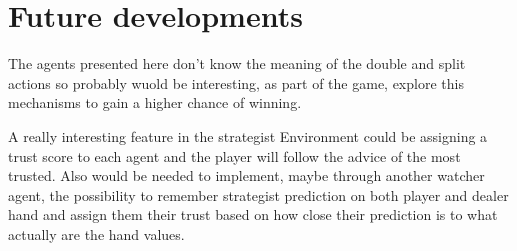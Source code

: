 \section{Future developments}

The agents presented here don't know the meaning of the double and split actions so probably wuold be interesting, as part of the game, explore this mechanisms to gain a higher chance of winning. 

A really interesting feature in the strategist Environment could be assigning a trust score to each agent and the player will follow the advice of the most trusted. Also would be needed to implement, maybe through another watcher agent, the possibility to remember strategist prediction on both player and dealer hand and assign them their trust based on how close their prediction is to what actually are the hand values.
